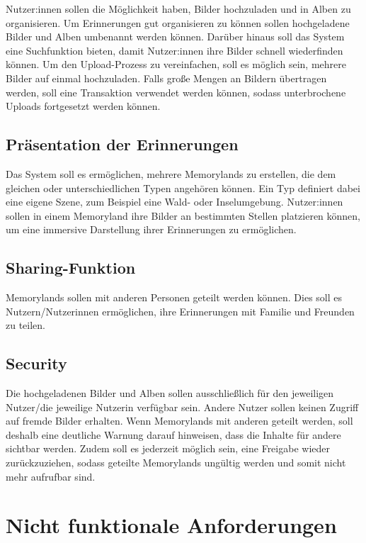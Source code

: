 Nutzer:innen sollen die Möglichkeit haben, Bilder hochzuladen und in Alben zu organisieren. 
Um Erinnerungen gut organisieren zu können sollen hochgeladene Bilder und Alben 
umbenannt werden können. Darüber hinaus soll das System eine Suchfunktion bieten, 
damit Nutzer:innen ihre Bilder schnell wiederfinden können. Um den Upload-Prozess zu 
vereinfachen, soll es möglich sein, mehrere Bilder auf einmal hochzuladen. Falls 
gro\ss{}e Mengen an Bildern übertragen werden, soll eine Transaktion verwendet werden
können, sodass unterbrochene Uploads fortgesetzt werden können.

\subsection{Präsentation der Erinnerungen}

Das System soll es ermöglichen, mehrere Memorylands zu erstellen, die dem 
gleichen oder unterschiedlichen Typen angehören können. Ein Typ definiert 
dabei eine eigene Szene, zum Beispiel eine Wald- oder Inselumgebung. Nutzer:innen sollen
in einem Memoryland ihre Bilder an bestimmten Stellen platzieren können, um 
eine immersive Darstellung ihrer Erinnerungen zu ermöglichen.

\subsection{Sharing-Funktion}

Memorylands sollen mit anderen Personen geteilt werden können. Dies soll es 
Nutzern/Nutzerinnen ermöglichen, ihre Erinnerungen mit Familie und Freunden zu teilen.

\subsection{Security}

Die hochgeladenen Bilder und Alben sollen ausschlie\ss{}lich für den jeweiligen Nutzer/die
jeweilige Nutzerin verfügbar sein. Andere Nutzer sollen keinen Zugriff auf fremde Bilder 
erhalten. Wenn Memorylands mit anderen geteilt werden, soll deshalb eine deutliche Warnung 
darauf hinweisen, dass die Inhalte für andere sichtbar werden. Zudem soll es jederzeit 
möglich sein, eine Freigabe wieder zurückzuziehen, sodass geteilte Memorylands ungültig 
werden und somit nicht mehr aufrufbar sind.

\section{Nicht funktionale Anforderungen}


